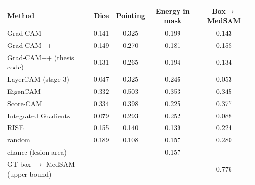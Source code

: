 \begin{tabular}{@{}lcccc@{}}
\toprule
Method & Dice & Pointing & Energy in mask & Box$\to$MedSAM \\
\midrule
Grad-CAM & 0.141 & 0.325 & 0.199 & 0.143 \\
Grad-CAM++ & 0.149 & 0.270 & 0.181 & 0.158 \\
Grad-CAM++ (thesis code) & 0.131 & 0.265 & 0.194 & 0.134 \\
LayerCAM (stage 3) & 0.047 & 0.325 & 0.246 & 0.053 \\
EigenCAM & 0.332 & 0.503 & 0.353 & 0.345 \\
Score-CAM & 0.334 & 0.398 & 0.225 & 0.377 \\
Integrated Gradients & 0.079 & 0.293 & 0.252 & 0.088 \\
RISE & 0.155 & 0.140 & 0.139 & 0.224 \\
random & 0.189 & 0.108 & 0.157 & 0.280 \\
\midrule
chance (lesion area) & -- & -- & 0.157 & -- \\
GT box $\to$ MedSAM (upper bound) & -- & -- & -- & 0.776 \\
\bottomrule
\end{tabular}